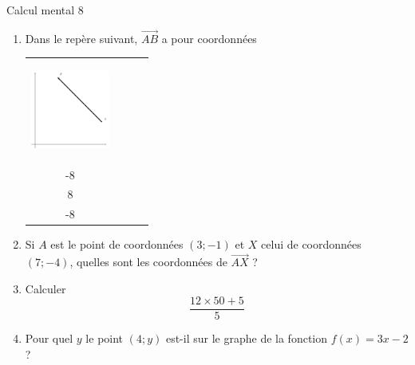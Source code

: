 \documentclass{beamer}
\newcommand{\vect}[1]{\overrightarrow{#1}}    %
\begin{document}
\begin{frame}{Calcul mental 8}
    \begin{enumerate}
            \pause
        \item

                Dans le repère suivant, \( \vect{ AB }\) a pour coordonnées 
            \begin{tabular}[]{cccc}

                \begin{minipage}{0.3\textwidth}
                \begin{center}
        \includegraphics[width=2.6cm]{Picture_FIGLabelFigUZlaYZPICTUZlaYZ-for_eps.png}
                \end{center}
                \end{minipage}
                
   &\( \begin{pmatrix}
       -3 \\ 
       -8 
   \end{pmatrix}\)&\( \begin{pmatrix}
       -3 \\ 
       8 
   \end{pmatrix}\)&\( \begin{pmatrix}
       3 \\ 
       -8 
   \end{pmatrix}\)\\
            \end{tabular}
            
 \pause            
        \item

            Si \( A\) est le point de coordonnées \( (3;-1)\) et \( X\) celui de coordonnées \( (7;-4)\), quelles sont les coordonnées de \( \vect{ AX }\) ?

            \pause
\item

    Calculer
    \begin{equation}
        \frac{ 12\times 50+5 }{ 5 }
    \end{equation}

    \pause

\item

    Pour quel \( y\) le point \( (4;y)\) est-il sur le graphe de la fonction \( f(x)=3x-2\) ?

    \end{enumerate}
    
\end{frame}
\end{document}
